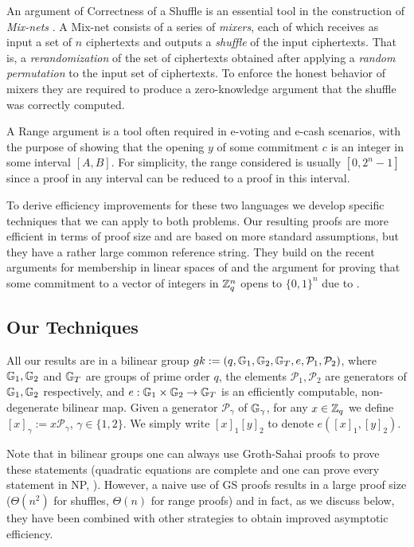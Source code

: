 An argument of Correctness of a Shuffle is an essential tool in the construction of \emph{Mix-nets} \cite{Chaum81}. A Mix-net consists of a series of \emph{mixers}, each of which receives as input a set of $n$ ciphertexts and  outputs a \emph{shuffle} of the input ciphertexts. That is, a \emph{rerandomization} of the set of ciphertexts obtained after applying a \emph{random permutation} to the input set of ciphertexts. To enforce the honest behavior of mixers they are required to produce a zero-knowledge argument that the shuffle was correctly computed.  

A Range argument is a tool often required in e-voting and e-cash scenarios, with the purpose of showing that the opening $y$ of some commitment $c$ is an integer in some interval $[A,B]$. For simplicity, the range considered is usually $[0,2^n-1]$ since a proof in any interval can be reduced to a proof in this interval.

To derive efficiency improvements for these two languages we develop specific techniques that we can apply to both problems. Our resulting proofs are more efficient in terms of proof size and are based on more standard assumptions, but they have a rather large common reference string. They build on the recent arguments for membership in linear spaces of \cite{EC:LPJY14,C:JutRoy14,EC:KilWee15} and the argument for proving that some commitment to a vector of integers in $\mathbb{Z}_q^{n}$ opens to $\{0,1\}^n$ due to \cite{AC:GonHevRaf15}. 
  
\subsection{Our Techniques}
All our results are in a bilinear group $gk:=(q,\mathbb{G}_1,\mathbb{G}_2,\mathbb{G}_T,e,\mathcal{P}_1,\mathcal{P}_2)$, where $\mathbb{G}_1,\mathbb{G}_2$
and $\mathbb{G}_T$ are groups of prime order $q$, the elements $\mathcal{P}_1, \mathcal{P}_2$ are generators of 
$\mathbb{G}_1,\mathbb{G}_2$ respectively, and $e:\mathbb{G}_1\times\mathbb{G}_2\to\mathbb{G}_T$ is an efficiently
computable, non-degenerate bilinear map. Given a generator $\mathcal{P}_\gamma$ of $\mathbb{G}_\gamma$, for any $x\in\mathbb{Z}_q$ we define $[x]_\gamma:=x\mathcal{P}_\gamma$, $\gamma\in\{1,2\}$. We simply write $[x]_1[y]_2$ to denote $e([x]_1,[y]_2)$.

Note that in bilinear groups one can always use Groth-Sahai proofs to prove these statements (quadratic equations are complete and one can prove every statement in NP, \cite{EC:GroOstSah06}).  However, a  naive use of GS proofs results in a large proof size ($\Theta(n^2)$ for shuffles, $\Theta(n)$ for range proofs) and in fact, as we discuss below, they have been combined with other strategies to obtain improved asymptotic efficiency. 

